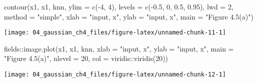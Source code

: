 \documentclass[
]{article}
\newenvironment{Shaded}{\begin{snugshade}}{\end{snugshade}}
\newcommand{\AttributeTok}[1]{\textcolor[rgb]{0.77,0.63,0.00}{#1}}
\newcommand{\DecValTok}[1]{\textcolor[rgb]{0.00,0.00,0.81}{#1}}
\newcommand{\FloatTok}[1]{\textcolor[rgb]{0.00,0.00,0.81}{#1}}
\newcommand{\FunctionTok}[1]{\textcolor[rgb]{0.00,0.00,0.00}{#1}}
\newcommand{\NormalTok}[1]{#1}
\newcommand{\SpecialCharTok}[1]{\textcolor[rgb]{0.00,0.00,0.00}{#1}}
\newcommand{\StringTok}[1]{\textcolor[rgb]{0.31,0.60,0.02}{#1}}
\begin{document}
\begin{Shaded}
\begin{Highlighting}[]
\FunctionTok{contour}\NormalTok{(x1, x1, knn,}
        \AttributeTok{ylim =} \FunctionTok{c}\NormalTok{(}\SpecialCharTok{{-}}\DecValTok{4}\NormalTok{, }\DecValTok{4}\NormalTok{), }
        \AttributeTok{levels =} \FunctionTok{c}\NormalTok{(}\SpecialCharTok{{-}}\FloatTok{0.5}\NormalTok{, }\DecValTok{0}\NormalTok{, }\FloatTok{0.5}\NormalTok{, }\FloatTok{0.95}\NormalTok{), }
        \AttributeTok{lwd =} \DecValTok{2}\NormalTok{,}
        \AttributeTok{method =} \StringTok{"simple"}\NormalTok{,}
        \AttributeTok{xlab =} \StringTok{"input, x"}\NormalTok{,}
        \AttributeTok{ylab =} \StringTok{"input, x\textquotesingle{}"}\NormalTok{,}
        \AttributeTok{main =} \StringTok{"Figure 4.5(a)"}\NormalTok{)}
\end{Highlighting}
\end{Shaded}

\begin{center}\texttt{[image: 04\_gaussian\_ch4\_files/figure-latex/unnamed-chunk-11-1]} \end{center}

\begin{Shaded}
\begin{Highlighting}[]
\NormalTok{fields}\SpecialCharTok{::}\FunctionTok{image.plot}\NormalTok{(x1, x1, knn,}
                   \AttributeTok{xlab =} \StringTok{"input, x"}\NormalTok{,}
                   \AttributeTok{ylab =} \StringTok{"input, x\textquotesingle{}"}\NormalTok{,}
                   \AttributeTok{main =} \StringTok{"Figure 4.5(a)"}\NormalTok{,}
                   \AttributeTok{nlevel =} \DecValTok{20}\NormalTok{, }
                   \AttributeTok{col =}\NormalTok{ viridis}\SpecialCharTok{::}\FunctionTok{viridis}\NormalTok{(}\DecValTok{20}\NormalTok{))}
\end{Highlighting}
\end{Shaded}

\begin{center}\texttt{[image: 04\_gaussian\_ch4\_files/figure-latex/unnamed-chunk-12-1]} \end{center}
\end{document}
